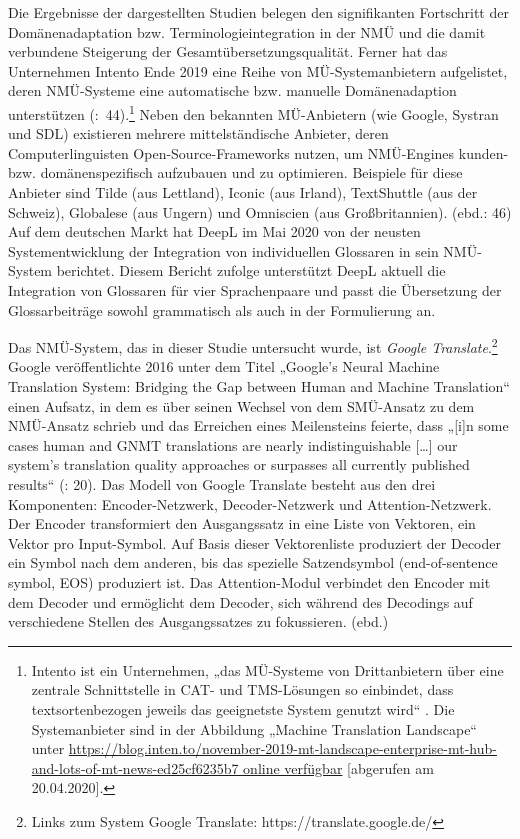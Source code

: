 Die Ergebnisse der dargestellten Studien belegen den signifikanten Fortschritt der Domänenadaptation bzw. Terminologieintegration in der NMÜ und die damit verbundene Steigerung der Gesamtübersetzungsqualität. Ferner hat das Unternehmen Intento Ende 2019 eine Reihe von MÜ-Systemanbietern aufgelistet, deren NMÜ-Systeme eine automatische bzw. manuelle Domänenadaption unterstützen (\citealt{Bruckner2020}:~44).\footnote{Intento ist ein Unternehmen, „das MÜ-Systeme von Drittanbietern über eine zentrale Schnittstelle in CAT- und TMS-Lösungen so einbindet, dass textsortenbezogen jeweils das geeignetste System genutzt wird“ \citep[44]{Bruckner2020}. Die Systemanbieter sind in der Abbildung „Machine Translation Landscape“ unter \url{https://blog.inten.to/november-2019-mt-landscape-enterprise-mt-hub-and-lots-of-mt-news-ed25cf6235b7 online verfügbar} [abgerufen am 20.04.2020].} Neben den bekannten MÜ-Anbietern (wie Google, Systran und SDL) existieren mehrere mittelständische Anbieter, deren Computerlinguisten Open-Source-Frameworks nutzen, um NMÜ-Engines kunden- bzw. domänenspezifisch aufzubauen und zu optimieren. Beispiele für diese Anbieter sind Tilde (aus Lettland), Iconic (aus Irland), TextShuttle (aus der Schweiz), Globalese (aus Ungern) und Omniscien (aus Großbritannien). (ebd.: 46) Auf dem deutschen Markt hat DeepL im Mai 2020 von der neusten Systementwicklung der Integration von individuellen Glossaren in sein NMÜ-System berichtet. Diesem Bericht zufolge unterstützt DeepL aktuell die Integration von Glossaren für vier Sprachenpaare und passt die Übersetzung der Glossarbeiträge sowohl grammatisch als auch in der Formulierung an. \citep{DeepL2020}

Das NMÜ-System, das in dieser Studie untersucht wurde, ist \textit{Google Translate}.\footnote{{{{Links zum System Google Translate:  https://translate.google.de/}}}} Google veröffentlichte 2016 unter dem Titel „Google’s Neural Machine Translation System: Bridging the Gap between Human and Machine Translation“ einen Aufsatz, in dem es über seinen Wechsel von dem SMÜ-Ansatz zu dem NMÜ-Ansatz schrieb und das Erreichen eines Meilensteins feierte, dass „[i]n some cases human and GNMT translations are nearly indistinguishable […] our system’s translation quality approaches or surpasses all currently published results“ (\citealt{WuEtAl2016}: 20). Das Modell von Google Translate besteht aus den drei Komponenten: Encoder-Netzwerk, Decoder-Netzwerk und Attention-Netzwerk. Der Encoder transformiert den Ausgangssatz in eine Liste von Vektoren, ein Vektor pro Input-Symbol. Auf Basis dieser Vektorenliste produziert der Decoder ein Symbol nach dem anderen, bis das spezielle Satzendsymbol (end-of-sentence symbol, EOS) produziert ist. Das Attention-Modul verbindet den Encoder mit dem Decoder und ermöglicht dem Decoder, sich während des Decodings auf verschiedene Stellen des Ausgangssatzes zu fokussieren. (ebd.)

